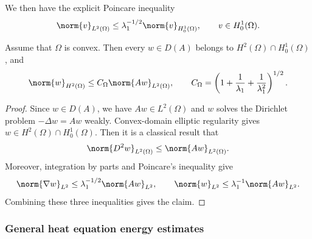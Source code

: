 We then have the explicit Poincare inequality
\begin{equation}\label{eq:poincare-h01}
    \norm{v}_{L^2(\Omega)}
    \le
    \lambda_1^{-1/2}\norm{v}_{H_0^1(\Omega)},
    \qquad v\in H_0^1(\Omega).
\end{equation}


\begin{lemma}\label{lem:convex-domain-A-H2}
Assume that \(\Omega\) is convex. Then every \(w\in D(A)\) belongs
to \(H^2(\Omega)\cap H_0^1(\Omega)\), and
\[
    \norm{w}_{H^2(\Omega)}
    \le
    C_\Omega\norm{Aw}_{L^2(\Omega)},
    \qquad
    C_\Omega
    =
    \left(
        1+\frac1{\lambda_1}+\frac1{\lambda_1^2}
    \right)^{1/2}.
\]
\end{lemma}

\begin{proof}
Since \(w\in D(A)\), we have \(Aw\in L^2(\Omega)\) and \(w\) solves the
Dirichlet problem \(-\Delta w=Aw\) weakly.  Convex-domain elliptic regularity
\cite[Theorem 3.2.1.2]{grisvard_1985} gives
\(w\in H^2(\Omega)\cap H_0^1(\Omega)\).  Then it is a classical result that
\[
    \norm{D^2 w}_{L^2(\Omega)}
    \le
    \norm{Aw}_{L^2(\Omega)}.
\]
Moreover, integration by parts and Poincare's inequality give
\[
    \norm{\nabla w}_{L^2}
    \le
    \lambda_1^{-1/2}\norm{Aw}_{L^2},
    \qquad
    \norm{w}_{L^2}
    \le
    \lambda_1^{-1}\norm{Aw}_{L^2}.
\]
Combining these three inequalities gives the claim.
\end{proof}

\subsubsection{General heat equation energy estimates}

